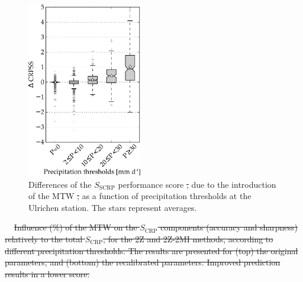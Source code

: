 \documentclass[hess, manuscript]{copernicus}
\providecommand{\DIFadd}[1]{{\protect\color{blue}\uwave{#1}}} %
\providecommand{\DIFdel}[1]{{\protect\color{red}\sout{#1}}}                      %
\providecommand{\DIFdelbegin}{} %
\providecommand{\DIFaddFL}[1]{\DIFadd{#1}} %
\providecommand{\DIFdelFL}[1]{\DIFdel{#1}} %
\providecommand{\DIFaddbeginFL}{} %
\providecommand{\DIFaddendFL}{} %
\providecommand{\DIFdelbeginFL}{} %
\providecommand{\DIFdelendFL}{} %
\begin{document}
	\begin{figure}[htb]
		\DIFdelbeginFL %
\DIFdelendFL \DIFaddbeginFL \includegraphics[width=5cm]{fig11.pdf}
		\DIFaddendFL \caption{Differences of the \DIFdelbeginFL \DIFdelFL{$S_{\text{SCRP}}$ }\DIFdelendFL \DIFaddbeginFL \DIFaddFL{CRPSS }\DIFaddendFL performance score \DIFdelbeginFL \DIFdelFL{, }\DIFdelendFL due to the introduction of the MTW \DIFdelbeginFL \DIFdelFL{, }\DIFdelendFL as a function of \DIFaddbeginFL \DIFaddFL{daily }\DIFaddendFL precipitation thresholds at the Ulrichen station. The stars represent averages.}
		\label{fig:changes_CRPS_precip_threshold}
	\end{figure}

	\DIFdelbegin %
\DIFdelFL{$
		\begin{array}{cccc}
		\end{array}$
	}%
{%
\DIFdelFL{Influence (\%) of the MTW on the $S_{\text{CRP}}$ components (accuracy and sharpness) relatively to the total $S_{\text{CRP}}$, for the 2Z and 2Z-2MI methods, according to different precipitation thresholds. The results are presented for (top) the original parameters, and (bottom) the recalibrated parameters. Improved prediction results in a lower score.}}
\end{document}
